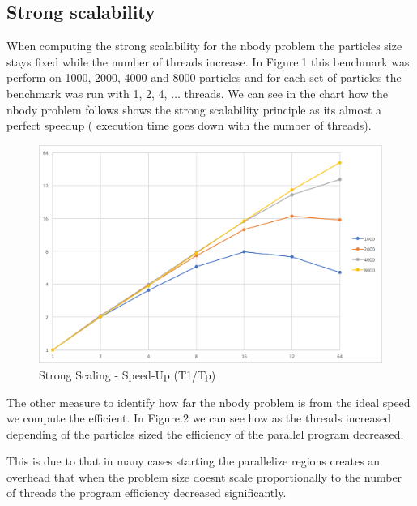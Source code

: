 \documentclass[12pt]{article} %
\begin{document}
\subsection{Strong scalability}
When computing the strong scalability for the nbody problem the particles size stays fixed while the number of threads increase. In Figure.1 this benchmark was perform on 1000, 2000, 4000 and 8000 particles and for each set of particles the benchmark was run with 1, 2, 4, $\dots$ threads. We can see in the chart how the nbody problem follows shows the strong scalability principle as its almost a perfect speedup ( execution time goes down with the number of threads).

\begin{figure}[htb]
\caption{Strong Scaling - Speed-Up (T1/Tp)}\label{fig:benchmark01}
\centering
\includegraphics[width=15cm,keepaspectratio]{imgs/img01.png}
\end{figure} 

\newpage

The other measure to identify how far the nbody problem is from the ideal speed we compute the efficient. In Figure.2 we can see how as the threads increased depending of the particles sized the efficiency of the parallel program decreased. 

This is due to that in many cases starting the parallelize regions creates an overhead that when the problem size doesnt scale proportionally to the number of threads the program efficiency decreased significantly. 
\end{document}
